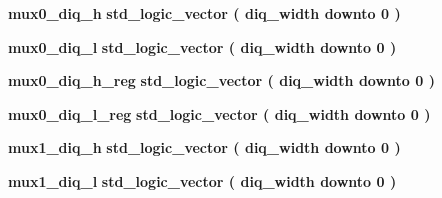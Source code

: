 \begin{DoxyCompactItemize}
{\bf mux0\+\_\+diq\+\_\+h} {\bfseries \textcolor{comment}{std\+\_\+logic\+\_\+vector}\textcolor{vhdlchar}{ }\textcolor{vhdlchar}{(}\textcolor{vhdlchar}{ }\textcolor{vhdlchar}{ }\textcolor{vhdlchar}{ }\textcolor{vhdlchar}{ }{\bfseries {\bf diq\+\_\+width}} \textcolor{vhdlchar}{ }\textcolor{keywordflow}{downto}\textcolor{vhdlchar}{ }\textcolor{vhdlchar}{ } \textcolor{vhdldigit}{0} \textcolor{vhdlchar}{ }\textcolor{vhdlchar}{)}\textcolor{vhdlchar}{ }} 
\item 
{\bf mux0\+\_\+diq\+\_\+l} {\bfseries \textcolor{comment}{std\+\_\+logic\+\_\+vector}\textcolor{vhdlchar}{ }\textcolor{vhdlchar}{(}\textcolor{vhdlchar}{ }\textcolor{vhdlchar}{ }\textcolor{vhdlchar}{ }\textcolor{vhdlchar}{ }{\bfseries {\bf diq\+\_\+width}} \textcolor{vhdlchar}{ }\textcolor{keywordflow}{downto}\textcolor{vhdlchar}{ }\textcolor{vhdlchar}{ } \textcolor{vhdldigit}{0} \textcolor{vhdlchar}{ }\textcolor{vhdlchar}{)}\textcolor{vhdlchar}{ }} 
\item 
{\bf mux0\+\_\+diq\+\_\+h\+\_\+reg} {\bfseries \textcolor{comment}{std\+\_\+logic\+\_\+vector}\textcolor{vhdlchar}{ }\textcolor{vhdlchar}{(}\textcolor{vhdlchar}{ }\textcolor{vhdlchar}{ }\textcolor{vhdlchar}{ }\textcolor{vhdlchar}{ }{\bfseries {\bf diq\+\_\+width}} \textcolor{vhdlchar}{ }\textcolor{keywordflow}{downto}\textcolor{vhdlchar}{ }\textcolor{vhdlchar}{ } \textcolor{vhdldigit}{0} \textcolor{vhdlchar}{ }\textcolor{vhdlchar}{)}\textcolor{vhdlchar}{ }} 
\item 
{\bf mux0\+\_\+diq\+\_\+l\+\_\+reg} {\bfseries \textcolor{comment}{std\+\_\+logic\+\_\+vector}\textcolor{vhdlchar}{ }\textcolor{vhdlchar}{(}\textcolor{vhdlchar}{ }\textcolor{vhdlchar}{ }\textcolor{vhdlchar}{ }\textcolor{vhdlchar}{ }{\bfseries {\bf diq\+\_\+width}} \textcolor{vhdlchar}{ }\textcolor{keywordflow}{downto}\textcolor{vhdlchar}{ }\textcolor{vhdlchar}{ } \textcolor{vhdldigit}{0} \textcolor{vhdlchar}{ }\textcolor{vhdlchar}{)}\textcolor{vhdlchar}{ }} 
\item 
{\bf mux1\+\_\+diq\+\_\+h} {\bfseries \textcolor{comment}{std\+\_\+logic\+\_\+vector}\textcolor{vhdlchar}{ }\textcolor{vhdlchar}{(}\textcolor{vhdlchar}{ }\textcolor{vhdlchar}{ }\textcolor{vhdlchar}{ }\textcolor{vhdlchar}{ }{\bfseries {\bf diq\+\_\+width}} \textcolor{vhdlchar}{ }\textcolor{keywordflow}{downto}\textcolor{vhdlchar}{ }\textcolor{vhdlchar}{ } \textcolor{vhdldigit}{0} \textcolor{vhdlchar}{ }\textcolor{vhdlchar}{)}\textcolor{vhdlchar}{ }} 
\item 
{\bf mux1\+\_\+diq\+\_\+l} {\bfseries \textcolor{comment}{std\+\_\+logic\+\_\+vector}\textcolor{vhdlchar}{ }\textcolor{vhdlchar}{(}\textcolor{vhdlchar}{ }\textcolor{vhdlchar}{ }\textcolor{vhdlchar}{ }\textcolor{vhdlchar}{ }{\bfseries {\bf diq\+\_\+width}} \textcolor{vhdlchar}{ }\textcolor{keywordflow}{downto}\textcolor{vhdlchar}{ }\textcolor{vhdlchar}{ } \textcolor{vhdldigit}{0} \textcolor{vhdlchar}{ }\textcolor{vhdlchar}{)}\textcolor{vhdlchar}{ }} 

\end{DoxyCompactItemize}

